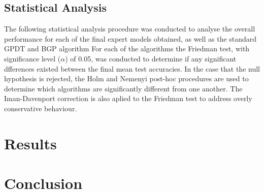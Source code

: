 \documentclass[conference]{IEEEtran}
\begin{document}
    \subsection{Statistical Analysis}

        The following statistical analysis procedure was conducted to analyse the overall performance for each of the final expert models
        obtained, as well as the standard GPDT and BGP algorithm For each of the algorithms the Friedman test, with significance level ($\alpha$) of 0.05,
        was conducted to determine if any significant dfferences existed between the final mean test accuracies. In the case that the null
        hypothesis is rejected, the Holm and Nemenyi post-hoc procedures are used to determine which algorithms are significantly different from
        one another. The Iman-Davenport correction is also aplied to the Friedman test to address overly conservative behaviour.

\section{Results} \label{Results}


\section{Conclusion} \label{Conclusion}




\end{document}

